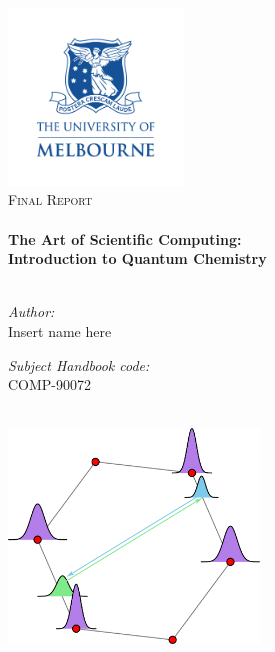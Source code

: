 \begin{titlepage}
\begin{center}

\includegraphics[width=0.35\textwidth]{figures/uom_banner.pdf}~\\[0.3cm]

\textsc{\Large Final Report}\\[0.3cm]

\HRule \\[0.3cm]
{ \huge \bfseries The Art of Scientific Computing:\\
Introduction to Quantum Chemistry}\\[0.3cm]

\HRule \\[0.8cm]

\begin{minipage}{0.45\textwidth}
\begin{flushleft} \large
\textit{Author:}\\
Insert name here
\end{flushleft}
\end{minipage}
\begin{minipage}{0.45\textwidth}
\begin{flushright} \large
\textit{Subject Handbook code:}\\
COMP-90072
\end{flushright}
\end{minipage}
\\[1.0cm]

\includegraphics[width=0.50\textwidth]{figures/coulomb_direct.pdf}~\\[0.5cm]


\end{center}
\end{titlepage}
